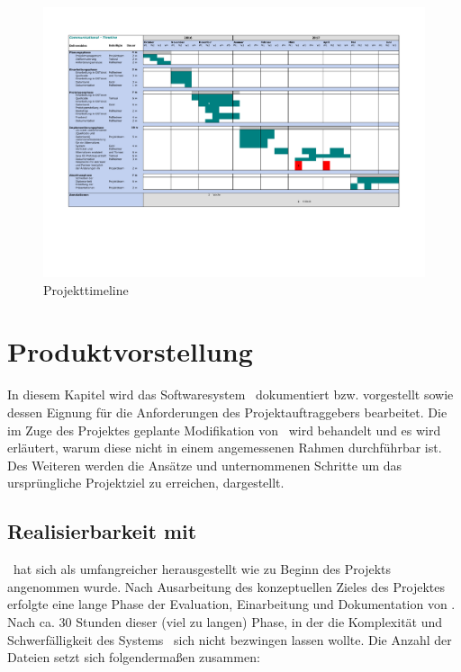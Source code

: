 \newpage
\begin{landscape}
	\begin{figure}[h]
		\centering
		\includegraphics[scale=.86]{figures/Timeline.pdf}
		\caption{Projekttimeline}
		\label{Abb_Projekt_Timeline_Gantt}
	\end{figure}
\end{landscape}

\chapter{Produktvorstellung}
In diesem Kapitel wird das Softwaresystem \getOst\ dokumentiert bzw. vorgestellt sowie dessen Eignung für die Anforderungen des Projektauftraggebers bearbeitet. Die im Zuge des Projektes geplante Modifikation von \getOst\ wird behandelt und es wird erläutert, warum diese nicht in einem angemessenen Rahmen durchführbar ist. Des Weiteren werden die Ansätze und unternommenen Schritte um das ursprüngliche Projektziel zu erreichen, dargestellt.

\section{Realisierbarkeit mit \getOst} \label{Realisierbarkeit mit \getOst}
\getOst\ hat sich als umfangreicher herausgestellt wie zu Beginn des Projekts angenommen wurde. Nach Ausarbeitung des konzeptuellen Zieles des Projektes erfolgte eine lange Phase der Evaluation, Einarbeitung und Dokumentation von \getOst. Nach ca. 30 Stunden dieser (viel zu langen) Phase, in der die Komplexität und Schwerfälligkeit des Systems \getOst\ sich nicht bezwingen lassen wollte. Die Anzahl der Dateien setzt sich folgendermaßen zusammen:

